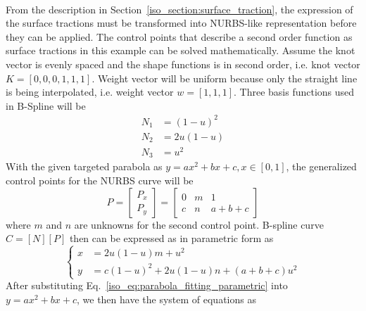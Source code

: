 \paragraph{}
From the description in Section~\ref{iso_section:surface_traction}, the expression of the surface tractions must be transformed into NURBS-like representation before they can be applied.
The control points that describe a second order function as surface tractions in this example can be solved mathematically.
Assume the knot vector is evenly spaced and the shape functions is in second order, i.e. knot vector $K=[0,0,0,1,1,1]$.
Weight vector will be uniform because only the straight line is being interpolated, i.e. weight vector $w=[1,1,1]$.
Three basis functions used in B-Spline will be
    \begin{equation}
    \begin{aligned}
        N_1 & = (1-u)^2 \\
        N_2 & = 2u(1-u) \\
        N_3 & = u^2
    \end{aligned}
    \end{equation}
%
With the given targeted parabola as $y=ax^2+bx+c,x \in [0,1]$, the generalized control points for the NURBS curve will be
    \begin{equation}
        P= \begin{bmatrix}
            P_x \\
            P_y
        \end{bmatrix} = \begin{bmatrix}
            0 & m & 1 \\
            c & n & a+b+c
        \end{bmatrix}
    \end{equation}
%
where $m$ and $n$ are unknowns for the second control point.
B-spline curve $C=[N][P]$ then can be expressed as in parametric form as
    \begin{equation}
        \left\{
        \begin{aligned}
            x &= 2u(1-u)m + u^2 \\
            y &= c(1-u)^2 + 2u(1-u)n + (a+b+c)u^2
        \end{aligned}
        \right.
    \label{iso_eq:parabola_fitting_parametric}
    \end{equation}
%
After substituting Eq.~\ref{iso_eq:parabola_fitting_parametric} into $y=ax^2+bx+c$, we then have the system of equations as
